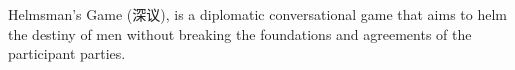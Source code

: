 Helmsman's Game (深议), is a diplomatic conversational game that aims to helm the destiny of men without breaking the foundations and agreements of the participant parties. 

